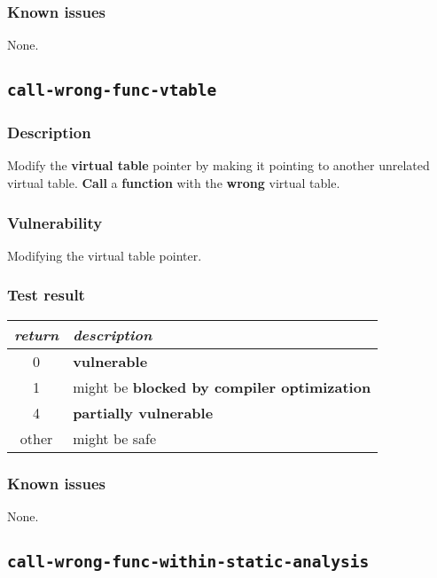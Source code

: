 \documentclass[a4paper]{book}
\begin{document}
\subsubsection{Known issues}
None.

\newpage

\subsection{\texttt{call-wrong-func-vtable}}\label{test-call-wrong-func-vtable}

\subsubsection{Description}
Modify the \textbf{virtual table} pointer by making it pointing to another unrelated virtual table.
\textbf{Call} a \textbf{function} with the \textbf{wrong} virtual table.

\subsubsection{Vulnerability}
Modifying the virtual table pointer.

\subsubsection{Test result}
\begin{tabular}{cl}
  \toprule
  \emph{return}  & \emph{description} \\
  \midrule
  0              & \textbf{vulnerable} \\
  1              & might be \textbf{blocked by compiler optimization} \\
  4              & \textbf{partially vulnerable} \\
  other          & might be safe \\
  \bottomrule
\end{tabular}
  
\subsubsection{Known issues}

None.

\newpage

\subsection{\texttt{call-wrong-func-within-static-analysis}}\label{test-call-wrong-func-within-static-analysis}
\end{document}
